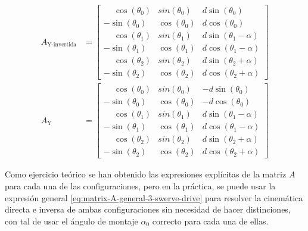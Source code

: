 \documentclass[11pt,a4paper]{article}
\begin{document}
\begin{equation}
    \begin{aligned}
        A_{\text{Y-invertida}} & = \begin{bmatrix}
                                       \phantom{-}\cos\left(\theta_0\right) & sin\left(\theta_0\right)  & d\sin\left(\theta_0\right)          \\
                                       -\sin\left(\theta_0\right)           & \cos\left(\theta_0\right) & d\cos\left(\theta_0\right)          \\
                                       \phantom{-}\cos\left(\theta_1\right) & sin\left(\theta_1\right)  & d\sin\left(\theta_1 - \alpha\right) \\
                                       -\sin\left(\theta_1\right)           & \cos\left(\theta_1\right) & d\cos\left(\theta_1 - \alpha\right) \\
                                       \phantom{-}\cos\left(\theta_2\right) & sin\left(\theta_2\right)  & d\sin\left(\theta_2 + \alpha\right) \\
                                       -\sin\left(\theta_2\right)           & \cos\left(\theta_2\right) & d\cos\left(\theta_2 + \alpha\right)
                                   \end{bmatrix} \\
        A_{\text{Y}}           & = \begin{bmatrix}
                                       \phantom{-}\cos\left(\theta_0\right) & sin\left(\theta_0\right)  & -d\sin\left(\theta_0\right)         \\
                                       -\sin\left(\theta_0\right)           & \cos\left(\theta_0\right) & -d\cos\left(\theta_0\right)         \\
                                       \phantom{-}\cos\left(\theta_1\right) & sin\left(\theta_1\right)  & d\sin\left(\theta_1 - \alpha\right) \\
                                       -\sin\left(\theta_1\right)           & \cos\left(\theta_1\right) & d\cos\left(\theta_1 - \alpha\right) \\
                                       \phantom{-}\cos\left(\theta_2\right) & sin\left(\theta_2\right)  & d\sin\left(\theta_2 + \alpha\right) \\
                                       -\sin\left(\theta_2\right)           & \cos\left(\theta_2\right) & d\cos\left(\theta_2 + \alpha\right)
                                   \end{bmatrix}
    \end{aligned}
\end{equation}

Como ejercicio teórico se han obtenido las expresiones explícitas de la matriz \(A\) para cada una de las configuraciones, pero en la práctica, se puede usar la expresión general \ref{eq:matrix-A-general-3-swerve-drive} para resolver la cinemática directa e inversa de ambas configuraciones sin necesidad de hacer distinciones, con tal de usar el ángulo de montaje \(\alpha_0\) correcto para cada una de ellas.
\end{document}
